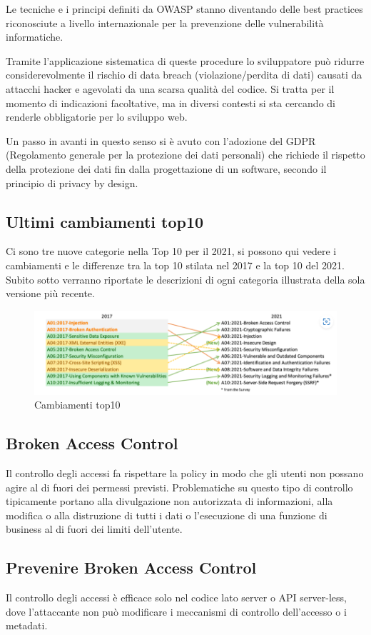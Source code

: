 Le tecniche e i principi definiti da OWASP stanno diventando delle best practices riconosciute a livello internazionale per la prevenzione delle vulnerabilità informatiche.

Tramite l’applicazione sistematica di queste procedure lo sviluppatore può ridurre considerevolmente il rischio di data breach (violazione/perdita di dati) causati da attacchi hacker e agevolati da una scarsa qualità del codice.
Si tratta per il momento di indicazioni facoltative, ma in diversi contesti si sta cercando di renderle obbligatorie per lo sviluppo web.

Un passo in avanti in questo senso si è avuto con l’adozione del GDPR (Regolamento generale per la protezione dei dati personali) che richiede il rispetto della protezione dei dati fin dalla progettazione di un software, secondo il principio di privacy by design.
\subsection{Ultimi cambiamenti top10} 
\cite{Top10}
Ci sono tre nuove categorie nella Top 10 per il 2021, si possono qui vedere i cambiamenti e le differenze tra la top 10 stilata nel 2017 e la top 10 del 2021.
Subito sotto verranno riportate le descrizioni di ogni categoria illustrata della sola versione più recente.
\begin{figure}[H]
    \centering
    \includegraphics[scale=0.8]{Immagini/img3.png}
    \caption{Cambiamenti top10}
    \label{fig:cambiamentiTop10}
\end{figure}
\subsection{Broken Access Control} 
Il controllo degli accessi fa rispettare la policy in modo che gli utenti non possano agire al di fuori dei permessi previsti. Problematiche su questo tipo di controllo tipicamente portano alla divulgazione non autorizzata di informazioni, alla modifica o alla distruzione di tutti i dati o l'esecuzione di una funzione di business al di fuori dei limiti dell'utente. 
\subsection{Prevenire Broken Access Control}
Il controllo degli accessi è efficace solo nel codice lato server o API server-less, dove l'attaccante non può modificare i meccanismi di controllo dell'accesso o i metadati.

